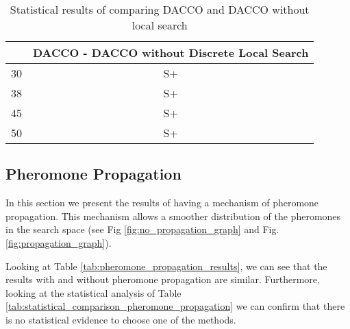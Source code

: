 		\begin{table}[!htdp]
				\begin{center}
					\begin{tabular}{| c | c |}
						\hline
						~ & \multicolumn{1}{p{4cm}|}{\textbf{DACCO - DACCO without Discrete Local Search}} \\ \hline
						30 & S+ \\ \hline
						38 & S+ \\ \hline
						45 & S+ \\ \hline
						50 & S+ \\ \hline
					\end{tabular}
					\caption{Statistical results of comparing DACCO and DACCO without local search}
					\label{tab:statistical_comparison_discrete_local_search}
				\end{center}
		\end{table}
		
		
		\pagebreak
		
		\subsection{Pheromone Propagation}
		
		In this section we present the results of having a mechanism of pheromone propagation. This mechanism allows a smoother distribution of the pheromones in the search space (see Fig \ref{fig:no_propagation_graph} and Fig.\ref{fig:propagation_graph}).
		
		Looking at Table \ref{tab:pheromone_propagation_results}, we can see that the results with and without pheromone propagation are similar. Furthermore, looking at the statistical analysis of Table \ref{tab:statistical_comparison_pheromone_propagation} we can confirm that there is no statistical evidence to choose one of the methods. 
		
		
		\pagebreak
		
